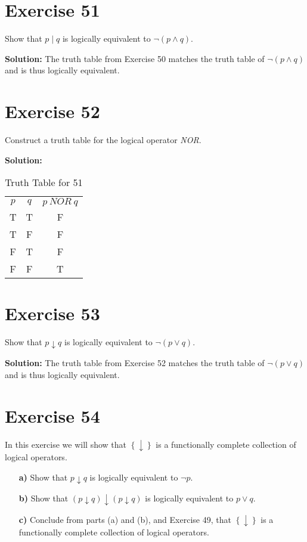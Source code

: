 \documentclass{Axon}
\begin{document}
\section*{Exercise 51}
Show that \(p \mathbin{\mid} q\) is logically equivalent to \(\lnot (p \land q)\).

\noindent
\textbf{Solution:}
The truth table from Exercise 50 matches the truth table of \(\lnot (p \land q)\) and is thus logically equivalent.

\section*{Exercise 52}
Construct a truth table for the logical operator \textit{NOR}.

\noindent
\textbf{Solution:}
\begin{table}[ht]
    \centering
    \begin{tabular}{c|c|c}
        \(p\) & \(q\) & \(p \ \textit{NOR} \ q\) \\
        T     & T     & F                         \\
        T     & F     & F                         \\
        F     & T     & F                         \\
        F     & F     & T
    \end{tabular}
    \caption{Truth Table for 51}
\end{table}

\section*{Exercise 53}
Show that \(p  \downarrow q\) is logically equivalent to \(\lnot (p \lor q)\).

\noindent
\textbf{Solution:}
The truth table from Exercise 52 matches the truth table of \(\lnot (p \lor q)\) and is thus logically equivalent.

\section*{Exercise 54}
In this exercise we will show that \(\left\{ \downarrow \right\}\) is a functionally complete collection of logical operators.
\begin{enumerate}
    \item[\textbf{a)}] Show that \(p \downarrow q\) is logically equivalent to \(\lnot p\).
    \item[\textbf{b)}] Show that \((p \downarrow q) \downarrow (p \downarrow q)\) is logically equivalent to \(p \lor q\).
    \item[\textbf{c)}] Conclude from parts (a) and (b), and Exercise 49, that \(\left\{\downarrow\right\}\) is a functionally complete collection of logical operators.
\end{enumerate}
\end{document}
